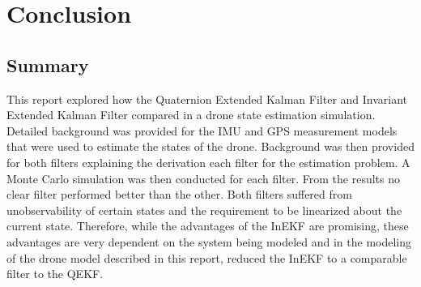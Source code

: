 \section{Conclusion}

\subsection{Summary}
This report explored how the Quaternion Extended Kalman Filter and Invariant Extended Kalman Filter compared in a drone state estimation simulation. Detailed background was provided for the IMU and GPS measurement models that were used to estimate the states of the drone. Background was then provided for both filters explaining the derivation each filter for the estimation problem. A Monte Carlo simulation was then conducted for each filter. From the results no clear filter performed better than the other. Both filters suffered from unobservability of certain states and the requirement to be linearized about the current state. Therefore, while the advantages of the InEKF are promising, these advantages are very dependent on the system being modeled and in the modeling of the drone model described in this report, reduced the InEKF to a comparable filter to the QEKF.


